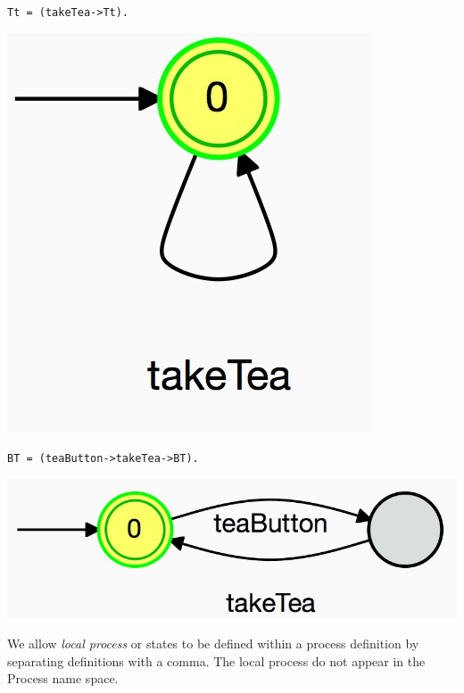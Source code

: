 \documentclass[]{article}
\begin{document}
\noindent
\begin{minipage}{0.45\textwidth}\begin{center}
\verb$Tt = (takeTea->Tt).$

\includegraphics[scale=0.15]{Tt.jpg} \end{center}\end{minipage}
\begin{minipage}{0.45\textwidth}
\begin{center}
\verb$BT = (teaButton->takeTea->BT).$

\includegraphics[scale=0.15]{BT.jpg}\end{center} \end{minipage}

  We allow \emph{local process} or states to be defined within a process  definition by separating definitions with a comma. The local process do not appear in the Process name space.
\end{document}
